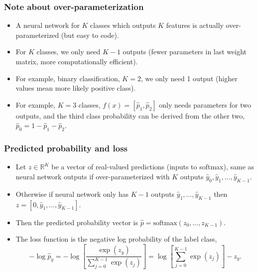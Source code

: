 \documentclass{beamer}
\begin{document}
\begin{frame}
  \frametitle{Note about over-parameterization}

  \begin{itemize}
  \item A neural network for $K$ classes which outputs $K$ features is
    actually over-parameterized (but easy to code).
  \item For $K$ classes, we only need $K-1$ outputs (fewer parameters
    in last weight matrix, more computationally efficient).
  \item For example, binary classification, $K=2$, we only need 1
    output (higher values mean more likely positive class).
  \item For example, $K=3$ classes, $f(x)=[\hat p_1,\hat p_2]$ only
    needs parameters for two outputs, and the third class probability
    can be derived from the other two, $\hat p_0=1-\hat p_1-\hat p_2$.
  \end{itemize}
\end{frame}

\begin{frame}
  \frametitle{Predicted probability and loss}

  \begin{itemize}
  \item Let $z\in\mathbb R^K$ be a vector of real-valued predictions
    (inputs to softmax), same as neural network outputs if
    over-parameterized with $K$ outputs
    $\hat y_0, \hat y_1,\dots,\hat y_{K-1}$.
  \item Otherwise if neural network only has $K-1$ outputs
    $\hat y_1,\dots,\hat y_{K-1}$ then
    $z=[0,\hat y_1,\dots,\hat y_{K-1}]$.
  \item Then the predicted probability vector is
    $\hat p=\text{softmax}(z_0,\dots,z_{K-1})$.
  \item The loss function is the negative log probability of the label
    class,
$$ 
-\log \hat p_y = -\log
\left[
\frac{
  \exp(z_y)
}{
  \sum_{j=0}^{K-1}
  \exp(z_j)
}
\right]
=
\log
\left[
\sum_{j=0}^{K-1}  \exp(z_j) 
\right]
-z_y.
$$
  \end{itemize}
  
\end{frame}
\end{document}
